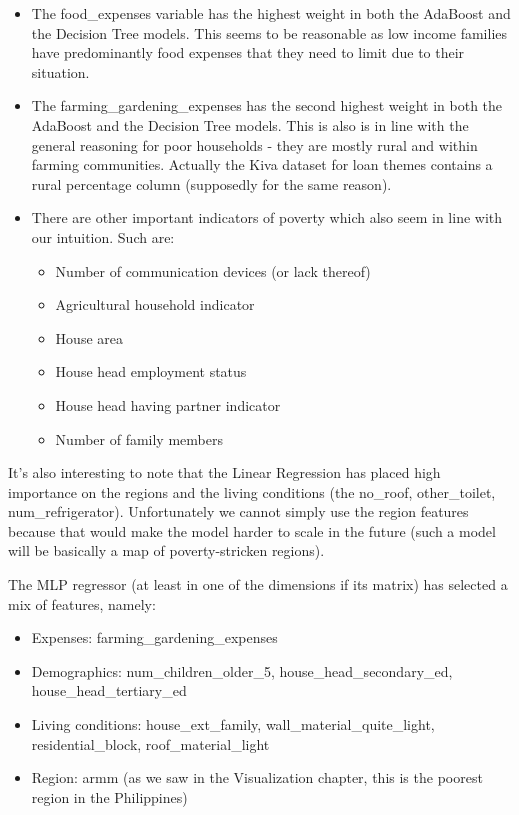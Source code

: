 \documentclass{article}
\begin{document}
\begin{itemize}
  \item The food\_expenses variable has the highest weight in both the AdaBoost and the Decision Tree models. This seems to be reasonable as low income families have predominantly food expenses that they need to limit due to their situation.
  \item The farming\_gardening\_expenses has the second highest weight in both the AdaBoost and the Decision Tree models. This is also is in line with the general reasoning for poor households - they are mostly rural and within farming communities. Actually the Kiva dataset for loan themes contains a rural percentage column (supposedly for the same reason).
  \item There are other important indicators of poverty which also seem in line with our intuition. Such are:
  \begin{itemize}
    \item Number of communication devices (or lack thereof)
    \item Agricultural household indicator
    \item House area
    \item House head employment status
    \item House head having partner indicator
    \item Number of family members
  \end{itemize}
\end{itemize}

It's also interesting to note that the Linear Regression has placed high importance on the regions and the living conditions (the no\_roof, other\_toilet, num\_refrigerator). Unfortunately we cannot simply use the region features because that would make the model harder to scale in the future (such a model will be basically a map of poverty-stricken regions).

The MLP regressor (at least in one of the dimensions if its matrix) has selected a mix of features, namely:

\begin{itemize}
  \item Expenses: farming\_gardening\_expenses
  \item Demographics: num\_children\_older\_5, house\_head\_secondary\_ed, house\_head\_tertiary\_ed
  \item Living conditions: house\_ext\_family, wall\_material\_quite\_light, residential\_block, roof\_material\_light
  \item Region: armm (as we saw in the Visualization chapter, this is the poorest region in the Philippines)
\end{itemize}
\end{document}
